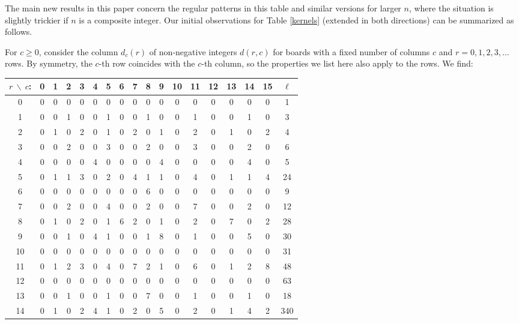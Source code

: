 The main new results in this paper concern the regular
patterns in this table and similar versions for larger $n$,
where the situation is slightly trickier if $n$ is a composite
integer. Our initial observations for Table \ref{kernels}
(extended in both directions) can be summarized as follows.

For $c\geq 0$, consider the column $d_c(r)$ of non-negative
integers $d(r, c)$ for boards with a fixed number of columns $c$
and $r=0,1,2,3,\ldots$ rows.
By symmetry, the $c$-th row coincides
with the $c$-th column, so the properties we list here also
apply to the rows. We find:

\begin{table}
  \begin{center}
    \begin{tabular}{|c|cccccccccccccccc|c|}
      \hline
$r\ \backslash\ c$:&0 &1 &2 &3 &4 &5 &6 &7 &8 &9 &10 &11 &12 &13 &14 &15 &$\ell$\\
      \hline
      \hline
0&0  &0 &0 &0 &0 &0 &0 &0 &0 &0 &0 &0 &0 &0 &0 &0 &1\\
1&0  &0 &1 &0 &0 &1 &0 &0 &1 &0 &0 &1 &0 &0 &1 &0 &3\\
2&0  &1 &0 &2 &0 &1 &0 &2 &0 &1 &0 &2 &0 &1 &0 &2 &4\\
3&0  &0 &2 &0 &0 &3 &0 &0 &2 &0 &0 &3 &0 &0 &2 &0 &6\\
4&0  &0 &0 &0 &4 &0 &0 &0 &0 &4 &0 &0 &0 &0 &4 &0 &5\\
5&0  &1 &1 &3 &0 &2 &0 &4 &1 &1 &0 &4 &0 &1 &1 &4 &24\\
6&0  &0 &0 &0 &0 &0 &0 &0 &6 &0 &0 &0 &0 &0 &0 &0 &9\\
7&0  &0 &2 &0 &0 &4 &0 &0 &2 &0 &0 &7 &0 &0 &2 &0 &12\\
8&0  &1 &0 &2 &0 &1 &6 &2 &0 &1 &0 &2 &0 &7 &0 &2 &28\\
9&0  &0 &1 &0 &4 &1 &0 &0 &1 &8 &0 &1 &0 &0 &5 &0 &30\\
10&0  &0 &0 &0 &0 &0 &0 &0 &0 &0 &0 &0 &0 &0 &0 &0 &31\\
11&0  &1 &2 &3 &0 &4 &0 &7 &2 &1 &0 &6 &0 &1 &2 &8 &48\\
12&0  &0 &0 &0 &0 &0 &0 &0 &0 &0 &0 &0 &0 &0 &0 &0 &63\\
13&0  &0 &1 &0 &0 &1 &0 &0 &7 &0 &0 &1 &0 &0 &1 &0 &18\\
14&0  &1 &0 &2 &4 &1 &0 &2 &0 &5 &0 &2 &0 &1 &4 &2 &340\\

\end{tabular}
\end{center}
\end{table}
